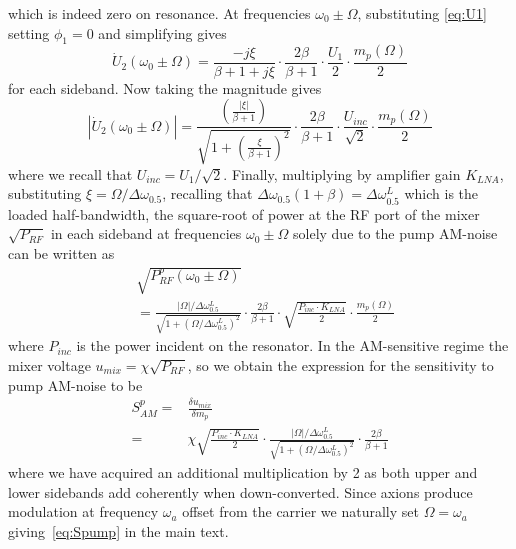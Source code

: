 \documentclass[
  aps,
  physrev,
  reprint,
  superscriptaddress,
  nofootinbib,
  amsmath,
  amssymb
]{revtex4-2}
\begin{document}
 which is indeed zero on resonance. At frequencies $\omega_0\pm\Omega$, substituting \eqref{eq:U1} setting $\phi_1 = 0$ and simplifying gives
\begin{equation}
    \dot{U}_2 (\omega_0 \pm \Omega) = \frac{-j\xi}{\beta + 1 + j\xi}\cdot\frac{2\beta}{\beta+1}\cdot\frac{U_1}{2}\cdot \frac{m_p(\Omega)}{2}
\end{equation}
for each sideband. Now taking the magnitude gives
\begin{equation}
    |\dot{U}_2 (\omega_0 \pm \Omega)| = \frac{\left(\frac{|\xi|}{\beta + 1}\right)}{\sqrt{1+\left(\frac{\xi}{\beta+1}\right)^2}}\cdot\frac{2\beta}{\beta+1}\cdot\frac{U_{inc}}{\sqrt{2}}\cdot \frac{m_{p}(\Omega)}{2}
\end{equation}
where we recall that $U_{inc} = U_1/\sqrt{2}$. Finally, multiplying by amplifier gain $K_{LNA}$, substituting $\xi = \Omega/\Delta\omega_{0.5}$, recalling that $\Delta\omega_{0.5}(1 + \beta) = \Delta\omega_{0.5}^L$ which is the loaded half-bandwidth, the square-root of power at the RF port of the mixer $\sqrt{P_{RF}}$ in each sideband at frequencies $\omega_0 \pm \Omega$ solely due to the pump AM-noise can be written as
\begin{equation}
    \begin{aligned}
        &\sqrt{P_{RF}^p (\omega_0 \pm \Omega)} \\
        &= \frac{|\Omega|/\Delta\omega_{0.5}^L}{\sqrt{1 + (\Omega/\Delta\omega_{0.5}^L)^2}}\cdot\frac{2\beta}{\beta+1}\cdot\sqrt{\frac{P_{inc} \cdot K_{LNA}}{2}} \cdot \frac{m_p(\Omega)}{2}
    \end{aligned}
\end{equation}
where $P_{inc}$ is the power incident on the resonator. In the AM-sensitive regime the mixer voltage $u_{mix} = \chi \sqrt{P_{RF}}$, so we obtain the expression for the sensitivity to pump AM-noise to be
\begin{equation}
    \begin{aligned}
        S_{AM}^p =& \frac{\delta u_{mix}}{\delta m_p} \\
        =& \chi\sqrt{\frac{P_{inc} \cdot K_{LNA}}{2}}\cdot\frac{|\Omega|/\Delta\omega_{0.5}^L}{\sqrt{1 + (\Omega/\Delta\omega_{0.5}^L)^2}}\cdot\frac{2\beta}{\beta+1}
    \end{aligned}
\end{equation}
where we have acquired an additional multiplication by 2 as both upper and lower sidebands add coherently when down-converted. Since axions produce modulation at frequency $\omega_a$ offset from the carrier we naturally set $\Omega = \omega_a$ giving~\eqref{eq:Spump} in the main text.
\end{document}
